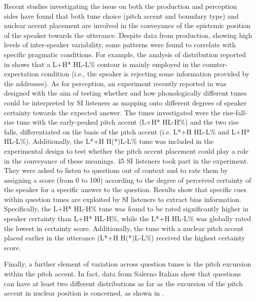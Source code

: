 \documentclass[output=paper,colorlinks,citecolor=brown]{langscibook}
\begin{document}
\newpage
Recent studies investigating the issue on both the production and perception sides have found that both tune choice (pitch accent and boundary type) and nuclear accent placement are involved in the conveyance of the epistemic position of the speaker towards the utterance. Despite data from production, showing high levels of inter-speaker variability, some patterns were found to correlate with specific pragmatic conditions. For example, the analysis of distribution reported in \citet{orrico19} shows that a L+H* HL-L\% contour is mainly employed in the counter-expectation condition (i.e., the speaker is rejecting some information provided by the addressee). As for perception, an experiment recently reported in \citet{orrico2022} was designed with the aim of testing whether and how phonologically different tunes could be interpreted by SI listeners as mapping onto different degrees of speaker certainty towards the expected answer. The tunes investigated were the rise-fall-rise tune with the early-peaked pitch accent (L+H* HL-H\%) and the two rise falls, differentiated on the basis of the pitch accent (i.e. L*+H HL-L\% and L+H* HL-L\%). Additionally, the L*+H H(*)L-L\% tune was included in the experimental design to test whether the pitch accent placement could play a role in the conveyance of these meanings. 45 SI listeners took part in the experiment. They were asked to listen to questions out of context and to rate them by assigning a score (from 0 to 100) according to the degree of perceived certainty of the speaker for a specific answer to the question. Results show that specific cues within question tunes are exploited by SI listeners to extract bias information. Specifically, the L+H* HL-H\% tune was found to be rated significantly higher in speaker certainty than L+H* HL-H\%, while the L*+H HL-L\% was globally rated the lowest in certainty score. Additionally, the tune with a nuclear pitch accent placed earlier in the utterance (L*+H H(*)L-L\%) received the highest certainty score.

Finally, a further element of variation across question tunes is the pitch excursion within the pitch accent. In fact, data from Salerno Italian show that questions can have at least two different distributions as far as the excursion of the pitch accent in nuclear position is concerned, as shown in .
\end{document}
